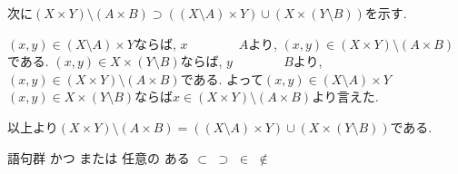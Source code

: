 \documentclass[dvipdfmx,a4paper,11pt]{article}
\theoremstyle{definition}
\begin{document}
次に$(X \times Y)\setminus (A \times B)
\supset
((X \setminus A) \times Y) \cup (X \times (Y \setminus B))$を示す.

$(x, y) \in (X \setminus A) \times Y$ならば, $x\boxed{\phantom{hogehoge}} A$より, $(x, y) \in (X \times Y)\setminus (A \times B)$である. 
$(x,y)\in X \times (Y \setminus B)$ならば, $y \boxed{\phantom{hogehoge}} B$より, $(x, y) \in (X \times Y)\setminus (A \times B)$である. 
よって$(x, y) \in (X \setminus A) \times Y$\boxed{\phantom{hogehoge}}$(x, y) \in X \times (Y \setminus B)$ならば$x \in (X \times Y)\setminus (A \times B)$より言えた. 

以上より$(X \times Y)\setminus (A \times B)
=
((X \setminus A) \times Y) \cup (X \times (Y \setminus B))$である.

\begin{itembox}[l]{語句群}
かつ \quad または \quad 任意の \quad ある \quad $\subset$ \quad $\supset$
\quad $\in$ \quad $\not\in$ 
\end{itembox}

  
\end{document}
